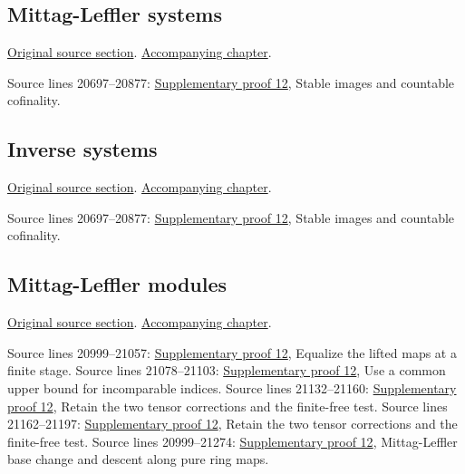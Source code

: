 \subsection{Mittag-Leffler systems}
\hypertarget{algebra-source-section-mittag-leffler}{}
\noindent\href{https://github.com/stacks/stacks-project/blob/a04446e57ec1fbc252a871afcec7752fb2807b14/algebra.tex\#L20697}{Original source section}. \href{algebra.pdf\#nameddest=section-mittag-leffler}{Accompanying chapter}.

\begin{AlgebraSourceRoutes}
 Source lines 20697--20877: \hyperlink{algebra_ml_review_notes_20260927}{Supplementary proof 12}, Stable images and countable cofinality.
\end{AlgebraSourceRoutes}

\subsection{Inverse systems}
\hypertarget{algebra-source-section-inverse-systems}{}
\noindent\href{https://github.com/stacks/stacks-project/blob/a04446e57ec1fbc252a871afcec7752fb2807b14/algebra.tex\#L20816}{Original source section}. \href{algebra.pdf\#nameddest=section-inverse-systems}{Accompanying chapter}.

\begin{AlgebraSourceRoutes}
 Source lines 20697--20877: \hyperlink{algebra_ml_review_notes_20260927}{Supplementary proof 12}, Stable images and countable cofinality.
\end{AlgebraSourceRoutes}

\subsection{Mittag-Leffler modules}
\hypertarget{algebra-source-section-mittag-leffler-modules}{}
\noindent\href{https://github.com/stacks/stacks-project/blob/a04446e57ec1fbc252a871afcec7752fb2807b14/algebra.tex\#L20881}{Original source section}. \href{algebra.pdf\#nameddest=section-mittag-leffler-modules}{Accompanying chapter}.

\begin{AlgebraSourceRoutes}
 Source lines 20999--21057: \hyperlink{algebra_ml_review_notes_20260927}{Supplementary proof 12}, Equalize the lifted maps at a finite stage.
 Source lines 21078--21103: \hyperlink{algebra_ml_review_notes_20260927}{Supplementary proof 12}, Use a common upper bound for incomparable indices.
 Source lines 21132--21160: \hyperlink{algebra_ml_review_notes_20260927}{Supplementary proof 12}, Retain the two tensor corrections and the finite-free test.
 Source lines 21162--21197: \hyperlink{algebra_ml_review_notes_20260927}{Supplementary proof 12}, Retain the two tensor corrections and the finite-free test.
 Source lines 20999--21274: \hyperlink{algebra_ml_review_notes_20260927}{Supplementary proof 12}, Mittag-Leffler base change and descent along pure ring maps.
\end{AlgebraSourceRoutes}

